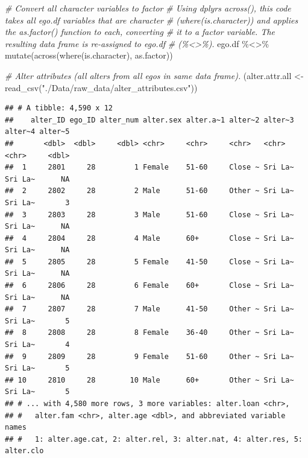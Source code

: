 \documentclass[
]{book}
\newenvironment{Shaded}{\begin{snugshade}}{\end{snugshade}}
\newcommand{\CommentTok}[1]{\textcolor[rgb]{0.56,0.35,0.01}{\textit{#1}}}
\newcommand{\FunctionTok}[1]{\textcolor[rgb]{0.00,0.00,0.00}{#1}}
\newcommand{\NormalTok}[1]{#1}
\newcommand{\OtherTok}[1]{\textcolor[rgb]{0.56,0.35,0.01}{#1}}
\newcommand{\SpecialCharTok}[1]{\textcolor[rgb]{0.00,0.00,0.00}{#1}}
\newcommand{\StringTok}[1]{\textcolor[rgb]{0.31,0.60,0.02}{#1}}
\begin{document}
\begin{Shaded}
\begin{Highlighting}[]
\CommentTok{\# Convert all character variables to factor}
\CommentTok{\# Using dplyr\textquotesingle{}s across(), this code takes all ego.df variables that are character}
\CommentTok{\# (where(is.character)) and applies the as.factor() function to each, converting }
\CommentTok{\# it to a factor variable. The resulting data frame is re{-}assigned to ego.df }
\CommentTok{\# (\%\textless{}\textgreater{}\%).}
\NormalTok{ego.df }\SpecialCharTok{\%\textless{}\textgreater{}\%} 
  \FunctionTok{mutate}\NormalTok{(}\FunctionTok{across}\NormalTok{(}\FunctionTok{where}\NormalTok{(is.character), as.factor))}

\CommentTok{\# Alter attributes (all alters from all egos in same data frame).}
\NormalTok{(alter.attr.all }\OtherTok{\textless{}{-}} \FunctionTok{read\_csv}\NormalTok{(}\StringTok{"./Data/raw\_data/alter\_attributes.csv"}\NormalTok{))}
\end{Highlighting}
\end{Shaded}

\begin{verbatim}
## # A tibble: 4,590 x 12
##    alter_ID ego_ID alter_num alter.sex alter.a~1 alter~2 alter~3 alter~4 alter~5
##       <dbl>  <dbl>     <dbl> <chr>     <chr>     <chr>   <chr>   <chr>     <dbl>
##  1     2801     28         1 Female    51-60     Close ~ Sri La~ Sri La~      NA
##  2     2802     28         2 Male      51-60     Other ~ Sri La~ Sri La~       3
##  3     2803     28         3 Male      51-60     Close ~ Sri La~ Sri La~      NA
##  4     2804     28         4 Male      60+       Close ~ Sri La~ Sri La~      NA
##  5     2805     28         5 Female    41-50     Close ~ Sri La~ Sri La~      NA
##  6     2806     28         6 Female    60+       Close ~ Sri La~ Sri La~      NA
##  7     2807     28         7 Male      41-50     Other ~ Sri La~ Sri La~       5
##  8     2808     28         8 Female    36-40     Other ~ Sri La~ Sri La~       4
##  9     2809     28         9 Female    51-60     Other ~ Sri La~ Sri La~       5
## 10     2810     28        10 Male      60+       Other ~ Sri La~ Sri La~       5
## # ... with 4,580 more rows, 3 more variables: alter.loan <chr>,
## #   alter.fam <chr>, alter.age <dbl>, and abbreviated variable names
## #   1: alter.age.cat, 2: alter.rel, 3: alter.nat, 4: alter.res, 5: alter.clo
\end{verbatim}
\end{document}
